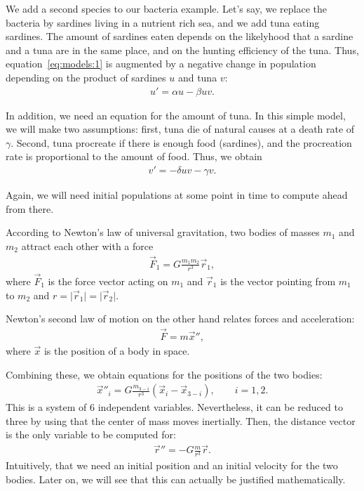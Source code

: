 \begin{example}
  We add a second species to our bacteria example. Let's say, we
  replace the bacteria by sardines living in a nutrient rich sea, and
  we add tuna eating sardines. The amount of sardines eaten depends on
  the likelyhood that a sardine and a tuna are in the same place, and
  on the hunting efficiency of the tuna. Thus,
  equation~\eqref{eq:models:1} is augmented by a negative change in
  population depending on the product of sardines $u$ and tuna $v$:
  \begin{gather*}
    u' = \alpha u - \beta u v.
  \end{gather*}

  In addition, we need an equation for the amount of tuna. In this
  simple model, we will make two assumptions: first, tuna die of
  natural causes at a death rate of $\gamma$. Second, tuna procreate
  if there is enough food (sardines), and the procreation rate is
  proportional to the amount of food. Thus, we obtain
  \begin{gather*}
    v' = -\delta u v - \gamma v.
  \end{gather*}

  Again, we will need initial populations at some point in time to
  compute ahead from there.
\end{example}

\begin{example}
  According to Newton's law of universal gravitation, two bodies of
  masses $m_1$ and $m_2$ attract each other with a force
  \begin{gather*}
    \vec F_1 = G \frac{m_1m_2}{r^3} \vec r_1,
  \end{gather*}
  where $\vec F_1$ is the force vector acting on $m_1$ and $\vec r_1$
  is the vector pointing from $m_1$ to $m_2$ and $r = \lvert\vec r_1\rvert = \lvert\vec r_2\rvert$.

  Newton's second law of motion on the other hand relates forces and
  acceleration:
  \begin{gather*}
    \vec F = m \vec x'',
  \end{gather*}
  where $\vec x$ is the position of a body in space.

  Combining these, we obtain equations for the positions of the two bodies:
  \begin{gather*}
    \vec x''_i = G \frac{m_{3-i}}{r^3} (\vec x_i - \vec x_{3-i}), \qquad i=1,2.
  \end{gather*}
  This is a system of 6 independent variables. Nevertheless, it can be
  reduced to three by using that the center of mass moves
  inertially. Then, the distance vector is the only variable to be
  computed for:
  \begin{gather*}
    \vec r'' = - G \frac{m}{r^3} \vec r.
  \end{gather*}
  Intuitively, that we need an initial position and an initial
  velocity for the two bodies. Later on, we will see that this can
  actually be justified mathematically.
\end{example}

